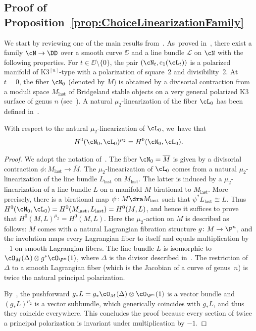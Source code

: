 \subsection{Proof of Proposition~\ref{prop:ChoiceLinearizationFamily}}\label{subsec:LinearizationLagrangian}

We start by reviewing one of the main results from~\cite{involutions1}. As~proved in~\cite[\S 5.3]{involutions1}, there exist a family $\cN\to\DD$ over a smooth curve $\DD$ and a line bundle $\mathcal{L}$ on $\cN$ with the following properties.
For $t\in\DD\setminus\{0\}$, the pair $(\cN_t,\mathrm{c}_1(\cL_t))$ is a polarized \HK manifold of K3$^{[n]}$-type with a polarization of square~2 and divisibility~2.
At $t=0$, the fiber $\cN_0$ (denoted by $\overline{M}$) is obtained by a divisorial contraction from a moduli space $M_{\mathrm{last}}$ of Bridgeland stable objects on a very general polarized K3 surface of genus $n$ (see~\cite[Lem.\,3.22]{involutions1}).
A natural $\mu_2$-linearization of the fiber $\cL_0$ has been defined in~\cite[Prop.\,5.13]{involutions1}.

\begin{prop}\label{prop:H0Invariant}
With respect to the natural $\mu_2$-linearization of $\cL_0$, we~have that
\[
H^0(\cN_0,\cL_0)^{\mu_2} = H^0(\cN_0,\cL_0).
\]
\end{prop}

\begin{proof}
We adopt the notation of~\cite{involutions1}. The fiber $\cN_0=\overline{M}$ is given by a divisorial contraction $\phi\colon M_{\mathrm{last}}\to \overline{M}$.
The $\mu_2$-linearization of $\cL_0$ comes from a natural $\mu_2$-linearization of the line bundle $L_{\mathrm{last}}$ on $M_{\mathrm{last}}$. The latter
is induced by a $\mu_2$-linearization of a line bundle $L$ on
a \HK manifold $M$ birational to $M_{\mathrm{last}}$. More precisely, there is a birational map $\psi\colon M\dra M_{\mathrm{last}}$ such that $\psi^{*}L_{\mathrm{last}}\cong L$. Thus
$H^0(\cN_0,\cL_0)=H^0(M_{\mathrm{last}},L_{\mathrm{last}})=H^0(M,L)$, and hence it suffices to prove that
$H^0(M,L)^{\mu_2} =H^0(M,L)$. Here the $\mu_2$-action on $M$ is described as follows: $M$ comes with a natural Lagrangian fibration structure $g\colon M\to \P^n$, and the involution maps every Lagrangian fiber to itself and equals multiplication by $-1$ on smooth Lagrangian fibers.
The line bundle $L$ is isomorphic to $\cO_{M}(\Delta)\otimes g^*\cO_{\P^n}(1)$, where $\Delta$ is the divisor described in~\cite[Prop.\,3.4]{involutions1}.
The restriction of $\Delta$ to a smooth Lagrangian fiber (which is the Jacobian of a curve of genus~$n$) is twice the natural
principal polarization.

By~\cite[Th.\,10.32]{Kollar:SingularitiesMMP}, the pushforward $g_* L=g_*\cO_M(\Delta)\otimes\cO_{\P^n}(1)$ is a vector bundle and $(g_* L)^{\mu_2}$ is a vector subbundle, which generically coincides with $g_* L$, and thus they coincide everywhere.
This concludes the proof because every section of twice a
principal polarization is invariant under multiplication by $-1$.
\end{proof}

